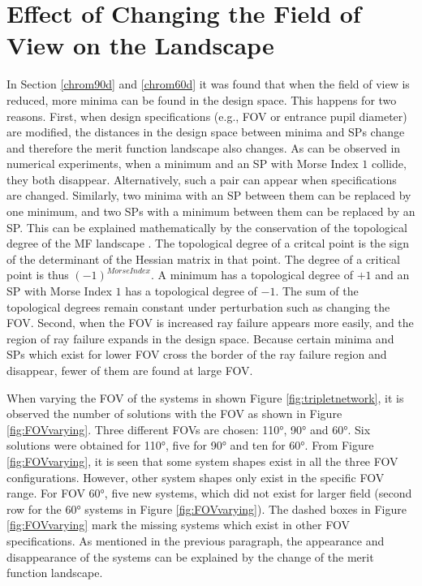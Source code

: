 \section{Effect of Changing the Field of View on the Landscape}
In Section \ref{chrom90d} and \ref{chrom60d} it was found that when the field of view is reduced, more minima can be found in the design space. This happens for two reasons. First, when design specifications (e.g., FOV or entrance pupil diameter) are modified, the distances in the design space between minima and SPs change
and therefore the merit function landscape also changes. As can be observed in numerical experiments, when a minimum and an SP with Morse Index $1$ collide, they both disappear. Alternatively, such a pair can appear when specifications are changed. Similarly, two minima with an SP between them can be replaced by one minimum, and two SPs with a minimum between them can be replaced by an SP. This can be explained mathematically by the conservation of the topological degree of the MF landscape \cite{vanTurnhoutThesis2009} \cite{KoornwinderTopologicaldegree}. The topological degree of a critcal point is the sign of the determinant of the Hessian matrix in that point. The degree of a critical point is thus $(-1)^{Morse Index}$. A minimum has a topological degree of $+1$ and an SP with Morse Index $1$ has a topological degree of $-1$. The sum of the topological degrees remain constant under perturbation such as changing the FOV. Second, when the FOV is increased ray failure appears more easily, and the region of ray failure expands in the design space. Because certain minima and SPs which exist for lower FOV cross the border of the ray failure region and disappear, fewer of them are found at large FOV.

 When varying the FOV of the systems in shown Figure \ref{fig:tripletnetwork}, it is observed the number of solutions with the FOV as shown in Figure \ref{fig:FOVvarying}. Three different FOVs are chosen: 110°, 90° and 60°. Six solutions were obtained for 110°, five for 90° and ten for 60°. From Figure \ref{fig:FOVvarying}, it is seen that some system shapes exist in all the three FOV configurations. However, other system shapes only exist in the specific FOV range.
For FOV 60°, five new systems, which did not exist for larger field (second row for the 60° systems in Figure \ref{fig:FOVvarying}). The dashed boxes in Figure \ref{fig:FOVvarying} mark the missing systems which exist in other FOV specifications. As mentioned in the previous paragraph, the appearance and disappearance of the systems can be explained by the change of the merit function landscape. 

